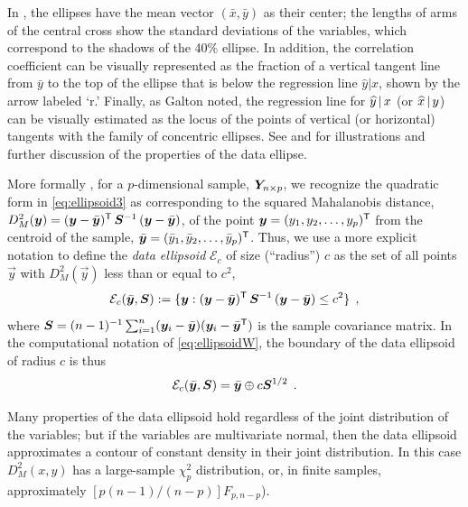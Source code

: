 In , the ellipses have the mean vector
$(\bar{x}, \bar{y})$ as their center;  the lengths of arms of the
central cross show the standard deviations of the variables, which
correspond to the shadows of the 40\% ellipse.  In
addition, the correlation coefficient can be visually represented as
the fraction of a vertical tangent line from $\bar{y}$ to the top of
the ellipse that is below the regression line $\widehat{y} | x$, shown
by the arrow labeled `r.' Finally, as Galton noted, the regression line
for $\widehat{y} \, | \, x$ (or $\widehat{x} \, | \, y$)
can be visually estimated as the locus of the points of vertical
(or horizontal) tangents with the family of concentric ellipses.
See \citet[Figs.~5.1--5.2]{Monette:90} and
\citet[p.~183]{Friendly:91} for illustrations and further discussion
of the properties of the data ellipse.

More formally \citep{Dempster:69,Monette:90}, for a $p$-dimensional
sample, $\bm{Y}_{n \times p}$,
we recognize the quadratic form in \eqref{eq:ellipsoid3}
as corresponding to the squared Mahalanobis distance,
$D^2_M (\bm{y}) = (\bm{y} - \bar{\bm{y}})^\mathsf{T} \, \bm{S}^{-1} \, (\bm{y} - \bar{\bm{y}})$,
of the point
$\bm{y} = (y_1, y_2, \dots , y_p)^\mathsf{T}$
from the centroid of the sample,
$\bar{\bm{y}} = (\bar{y}_1, \bar{y}_2, \dots , \bar{y}_p)^\mathsf{T}$.
Thus, we use a more explicit notation to
define the \emph{data ellipsoid} $\mathcal{E}_c$ of size (``radius'') $c$
as the set of all points $\vec{y}$ with $D^2_M (\vec{y})$ less than or
equal to $c^2$,
\begin{equation}\label{eq:dsq}
\mathcal{E}_c ( \bar{\bm{y}},  \bm{S} )
:= \{ \bm{y} :
(\bm{y} - \bar{\bm{y}})^\mathsf{T} \, \bm{S}^{-1} \, (\bm{y} - \bar{\bm{y}}) \le c^2 \} \:\: ,
\end{equation}
where
$\bm{S} = ({n-1})^{-1} \sum_{i=1}^n (\bm{y}_i - \bar{\bm{y}}) (\bm{y}_i - \bar{\bm{y}}^\mathsf{T})$
is the sample covariance matrix.  In the computational notation of \eqref{eq:ellipsoidW}, the boundary of the
data ellipsoid of radius $c$ is thus
\begin{equation}\label{eq:ellipsoidS}
\mathcal{E}_c(\bar{\bm{y}}, \bm{S}) = \bar{\bm{y}} \oplus c \bm{S}^{1/2} \:\: .
\end{equation}

Many properties of the data ellipsoid hold regardless of the joint distribution of the
variables; but if the variables are multivariate normal, then the data ellipsoid approximates
a contour of constant density in their joint distribution.  In this case $D^2_M (x,y)$
has a large-sample $\chi^2_p$ distribution, or, in finite samples, approximately
$[p (n-1) / (n-p)] F_{p, n-p}$).

